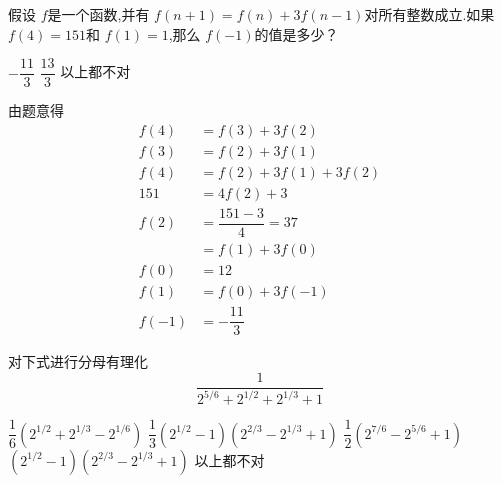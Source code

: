 \documentclass[answers]{exam}
\begin{document}
\begin{questions}
	\question 假设 \( f \)是一个函数,并有 \( f(n+1) = f(n) + 3f(n-1) \)对所有整数成立.如果 \( f(4) = 151 \)和 \( f(1)
	= 1\),那么 \( f(-1) \)的值是多少？

	\begin{oneparchoices}
		  \CorrectChoice \( -\dfrac{11}{3} \) \choice \( \dfrac{13}{3} \) \choice 以上都不对
	\end{oneparchoices}

	\begin{solution}
		由题意得
		\begin{align*}
			f(4)  & = f(3) + 3f(2)           \\
			f(3)  & = f(2) + 3f(1)           \\
			f(4)  & = f(2) + 3f(1) + 3f(2)   \\
			151   & = 4f(2) + 3              \\
			f(2)  & = \dfrac{151 -3}{4} = 37 \\
			      & = f(1) + 3f(0)           \\
			f(0)  & = 12                     \\
			f(1)  & = f(0) + 3f(-1)          \\
			f(-1) & = -\dfrac{11}{3}
		\end{align*}
	\end{solution}

	\question 对下式进行分母有理化
	\begin{equation*}
		\dfrac{1}{2^{5/6} + 2^{1/2} + 2^{1/3} + 1}
	\end{equation*}

	\begin{oneparchoices}
		\choice \( \dfrac{1}{6}(2^{1/2} + 2^{1/3} - 2^{1/6}) \)
		\choice \( \dfrac{1}{3}(2^{1/2} - 1)(2^{2/3} - 2^{1/3} + 1) \)
		\choice \( \dfrac{1}{2}(2^{7/6} - 2^{5/6} + 1) \)
		\CorrectChoice \( (2^{1/2} - 1)(2^{2/3} - 2^{1/3} + 1) \)
		\choice 以上都不对
	\end{oneparchoices}


\end{questions}
\end{document}
